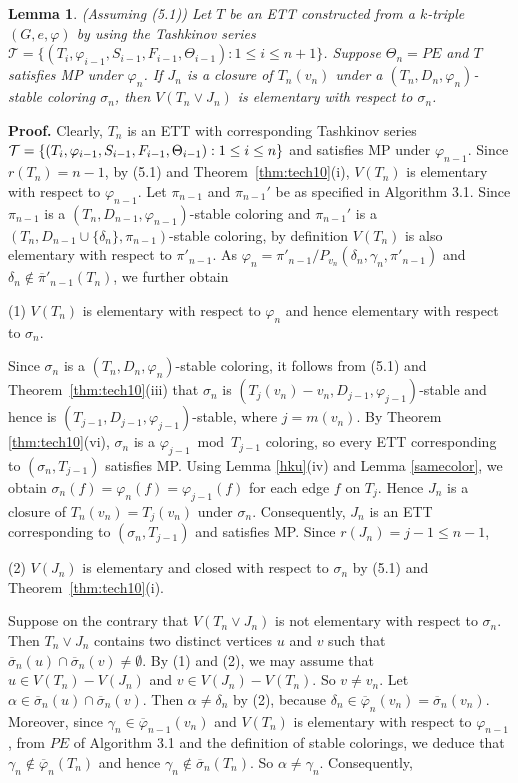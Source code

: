\documentclass[11pt]{article}
\newtheorem{lemma}[theorem]{Lemma}
\newcommand{\TT}{\mathcal {T}}
\newcommand{\phibar}{\overline{\varphi}}
\newcommand{\phiv}{\varphi}
\begin{document}
\begin{lemma}\label{elementary}
(Assuming (5.1)) Let $T$ be an ETT constructed from a $k$-triple $(G,e, \varphi)$ by using the Tashkinov series 
$\TT=\{(T_i, \phiv_{i-1}, S_{i-1}, F_{i-1}, \Theta_{i-1}): 1\le i \le n+1\}$. Suppose $\Theta_n=PE$ and $T$ satisfies 
MP under $\varphi_n$. If $J_n$ is a closure of $T_{n}(v_n)$ under a $(T_n,D_n,\varphi_n)$-stable coloring
$\sigma_n$, then $V(T_n\vee J_n)$ is elementary with respect to $\sigma_n$.
\end{lemma}

{\bf Proof.} 	Clearly, $T_n$ is an ETT with corresponding Tashkinov series $\TT=\{(T_i, \phiv_{i-1}, S_{i-1}, F_{i-1}, \\
\Theta_{i-1}): 1\le i \le n\}$ and satisfies MP under $\varphi_{n-1}$. Since $r(T_n)=n-1$, by (5.1) and Theorem~\ref{thm:tech10}(i), 
$V(T_n)$ is elementary with respect to $\varphi_{n-1}$. Let $\pi_{n-1}$ and $\pi_{n-1}'$ be as specified in Algorithm 3.1. Since 
$\pi_{n-1}$ is a $(T_n,D_{n-1}, \varphi_{n-1})$-stable coloring and $\pi_{n-1}'$ is a $(T_n,D_{n-1} 
\cup \{\delta_n\}, \pi_{n-1})$-stable coloring, by definition $V(T_n)$ is also elementary with respect to $\pi'_{n-1}$. As 
$\varphi_n=\pi'_{n-1}/P_{v_n}(\delta_n,\gamma_n, \pi'_{n-1})$ and $\delta_n\notin\overline{\pi}'_{n-1}(T_n)$, we further obtain

(1) $V(T_n)$ is elementary with respect to $\varphi_{n}$ and hence elementary with respect 
to $\sigma_n$. 

Since $\sigma_n$ is a $(T_n,D_n,\varphi_n)$-stable coloring, it follows from (5.1) and Theorem~\ref{thm:tech10}(iii) that 
$\sigma_n$ is $(T_{j}(v_n)-v_n, D_{j-1},\varphi_{j-1})$-stable and hence is $(T_{j-1}, D_{j-1}, \varphi_{j-1})$-stable, where  
$j=m(v_n)$. By Theorem \ref{thm:tech10}(vi), $\sigma_n$ is a $\phiv_{j-1}\bmod T_{j-1}$ coloring, so every ETT corresponding 
to $(\sigma_n, T_{j-1})$ satisfies MP.  Using Lemma \ref{hku}(iv) and Lemma \ref{samecolor}, we obtain $\sigma_n(f)=\varphi_n(f)=
\varphi_{j-1}(f)$ for each edge $f$ on $T_j$. Hence $J_n$ is a closure of $T_n(v_n)=T_j(v_n)$ under $\sigma_n$. Consequently,
$J_n$ is an ETT corresponding to $(\sigma_n, T_{j-1})$ and satisfies MP. Since $r(J_n)=j-1\le n-1$,

(2) $V(J_n)$ is elementary and closed with respect to $\sigma_{n}$ by (5.1) and Theorem~\ref{thm:tech10}(i).

Suppose on the contrary that $V(T_n\vee J_n)$ is not elementary with respect to $\sigma_n$. Then $T_n\vee J_n$ contains 
two distinct vertices $u$ and $v$ such that $\overline{\sigma}_n(u) \cap \overline{\sigma}_n(v) \ne \emptyset$.  By (1) 
and (2), we may assume that $u \in V(T_n)-V(J_n)$ and $v \in V(J_n)-V(T_n)$. So $v\neq v_n$. Let $\alpha\in \overline{\sigma}_n(u) \cap \overline{\sigma}_n(v)$. Then $\alpha\neq \delta_n$ by (2), because $\delta_n \in \overline{\varphi}_n(v_n)=
\overline{\sigma}_n(v_n)$. Moreover, since $\gamma_n\in\phibar_{n-1}(v_n)$ and $V(T_n)$ is elementary with respect to 
$\varphi_{n-1}$, from $PE$ of Algorithm 3.1 and the definition of stable colorings, we deduce that $\gamma_n\notin
\phibar_n(T_n)$ and hence $\gamma_n\notin \overline{\sigma}_n(T_n)$. So $\alpha\neq\gamma_n$. Consequently, 
\end{document}
